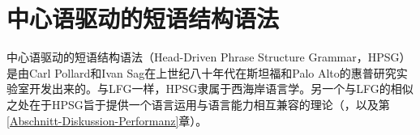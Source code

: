 
\chapter{中心语驱动的短语结构语法}
\label{Kapitel-HPSG}
\label{chap-HPSG}

中心语驱动的短语结构语法（Head-Driven Phrase Structure Grammar，HPSG） 是由Carl Pollard和Ivan Sag在上世纪八十年代在斯坦福和Palo Alto的惠普研究实验室开发出来的\citep{ps,ps2}。与LFG一样，HPSG隶属于西海岸语言学。另一个与LFG的相似之处在于HPSG旨于提供一个语言运用与语言能力相互兼容的理论（\citealp{SW2011a,SW2015a}，以及第\ref{Abschnitt-Diskussion-Performanz}章）。

